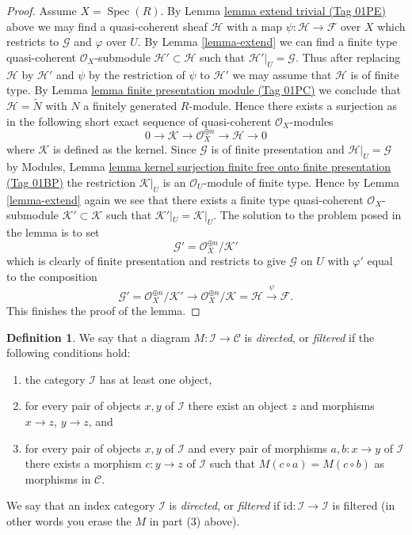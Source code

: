 \documentclass{amsart}
\theoremstyle{plain}
\theoremstyle{definition}
\newtheorem{definition}[subsection]{Definition}
\theoremstyle{remark}
\numberwithin{equation}{subsection}
\def\Spec{\mathop{\mathrm{Spec}}}
\begin{document}
\begin{proof}
\medskip\noindent
Assume $X = \Spec(R)$.
By Lemma \href{https://stacks.math.columbia.edu/tag/01PE}{lemma extend trivial (Tag 01PE)} above we may
find a quasi-coherent sheaf $\mathcal{H}$ with
a map $\psi : \mathcal{H} \to \mathcal{F}$ over $X$
which restricts to $\mathcal{G}$ and $\varphi$ over $U$.
By Lemma \ref{lemma-extend} we can find a finite type
quasi-coherent $\mathcal{O}_X$-submodule
$\mathcal{H}' \subset \mathcal{H}$
such that $\mathcal{H}'|_U = \mathcal{G}$. Thus after
replacing $\mathcal{H}$ by $\mathcal{H}'$
and $\psi$ by the restriction of $\psi$ to $\mathcal{H}'$
we may assume that $\mathcal{H}$ is of finite type.
By Lemma \href{https://stacks.math.columbia.edu/tag/01PC}{lemma finite presentation module (Tag 01PC)}
we conclude that $\mathcal{H} = \widetilde{N}$ with
$N$ a finitely generated $R$-module. Hence there exists a surjection
as in the following short exact sequence of
quasi-coherent $\mathcal{O}_X$-modules
$$
0 \to \mathcal{K} \to \mathcal{O}_X^{\oplus n} \to \mathcal{H} \to 0
$$
where $\mathcal{K}$ is defined as the kernel.
Since $\mathcal{G}$ is of finite presentation and
$\mathcal{H}|_U = \mathcal{G}$ by
Modules, Lemma
\href{https://stacks.math.columbia.edu/tag/01BP}{lemma kernel surjection finite free onto finite presentation (Tag 01BP)}
the restriction $\mathcal{K}|_U$ is
an $\mathcal{O}_U$-module of finite type. Hence by Lemma \ref{lemma-extend}
again we see that there exists a finite type quasi-coherent
$\mathcal{O}_X$-submodule $\mathcal{K}' \subset \mathcal{K}$ such
that $\mathcal{K}'|_U = \mathcal{K}|_U$. The solution to the problem
posed in the lemma is to set
$$
\mathcal{G}' = \mathcal{O}_X^{\oplus n}/\mathcal{K}'
$$
which is clearly of finite presentation and restricts to give $\mathcal{G}$
on $U$ with $\varphi'$ equal to the composition
$$
\mathcal{G}' = \mathcal{O}_X^{\oplus n}/\mathcal{K}'
\to \mathcal{O}_X^{\oplus n}/\mathcal{K} = \mathcal{H} \xrightarrow{\psi}
\mathcal{F}.
$$
This finishes the proof of the lemma.
\end{proof}


\begin{definition}
\label{categories-definition-directed}
We say that a diagram $M : \mathcal{I} \to \mathcal{C}$ is {\it directed},
or {\it filtered} if the following conditions hold:
\begin{enumerate}
\item the category $\mathcal{I}$ has at least one object,
\item for every pair of objects $x, y$ of $\mathcal{I}$
there exist an object $z$ and morphisms $x \to z$,
$y \to z$, and
\item for every pair of objects $x, y$ of $\mathcal{I}$
and every pair of morphisms $a, b : x \to y$ of $\mathcal{I}$
there exists a morphism $c : y \to z$ of $\mathcal{I}$
such that $M(c \circ a) = M(c \circ b)$ as morphisms in $\mathcal{C}$.
\end{enumerate}
We say that an index category $\mathcal{I}$ is {\it directed}, or
{\it filtered} if $\text{id} : \mathcal{I} \to \mathcal{I}$ is filtered
(in other words you erase the $M$ in part (3) above).
\end{definition}
\end{document}
